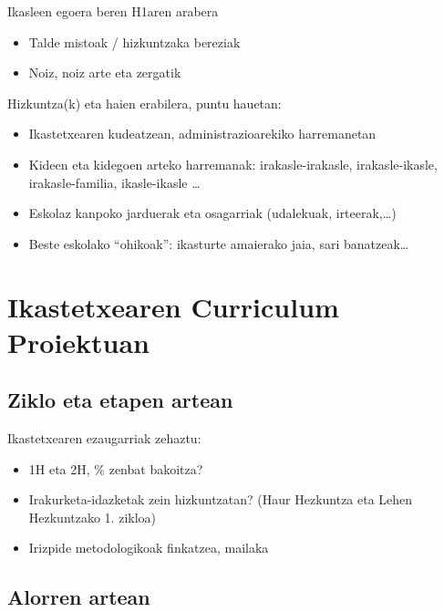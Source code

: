 \documentclass[
]{book}
\providecommand{\tightlist}{%
  \setlength{\itemsep}{0pt}\setlength{\parskip}{0pt}}
\begin{document}
Ikasleen egoera beren H1aren arabera

\begin{itemize}
\tightlist
\item
  Talde mistoak / hizkuntzaka bereziak
\item
  Noiz, noiz arte eta zergatik
\end{itemize}

Hizkuntza(k) eta haien erabilera, puntu hauetan:

\begin{itemize}
\tightlist
\item
  Ikastetxearen kudeatzean, administrazioarekiko harremanetan
\item
  Kideen eta kidegoen arteko harremanak: irakasle-irakasle, irakasle-ikasle, irakasle-familia, ikasle-ikasle \ldots{}
\item
  Eskolaz kanpoko jarduerak eta osagarriak (udalekuak, irteerak,\ldots)
\item
  Beste eskolako ``ohikoak'': ikasturte amaierako jaia, sari banatzeak\ldots{}
\end{itemize}

\hypertarget{ikastetxearen-curriculum-proiektuan}{%
\section{Ikastetxearen Curriculum Proiektuan}\label{ikastetxearen-curriculum-proiektuan}}

\hypertarget{ziklo-eta-etapen-artean}{%
\subsection{Ziklo eta etapen artean}\label{ziklo-eta-etapen-artean}}

Ikastetxearen ezaugarriak zehaztu:

\begin{itemize}
\tightlist
\item
  1H eta 2H, \% zenbat bakoitza?
\item
  Irakurketa-idazketak zein hizkuntzatan? (Haur Hezkuntza eta Lehen Hezkuntzako 1. zikloa)
\item
  Irizpide metodologikoak finkatzea, mailaka
\end{itemize}

\hypertarget{alorren-artean}{%
\subsection{Alorren artean}\label{alorren-artean}}
\end{document}
